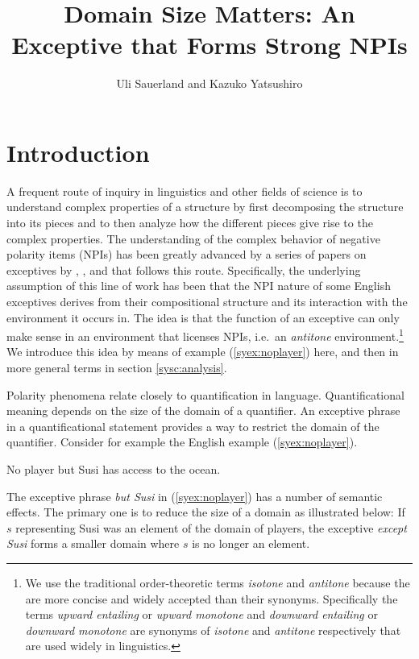 \documentclass[output=paper,colorlinks,citecolor=brown,
]{langscibook}
\author{
    Uli Sauerland%
        \affiliation{Osaka University; Leibniz-Centre General Linguistics}
    and 
    Kazuko Yatsushiro%
        \affiliation{Leibniz-Centre General Linguistics}
}
\title{Domain Size Matters: An Exceptive that Forms Strong NPIs}
\begin{document}

\maketitle


\section{Introduction}

A frequent route of inquiry in linguistics and other fields of science is to understand complex properties of a structure by first decomposing the structure into its pieces and to then analyze how the different pieces give rise to the complex properties.
The understanding of the complex behavior of negative polarity items (NPIs) has been greatly advanced by a series of papers on exceptives by \cite{fintel93}, \cite{gajewski08b}, and \cite{hirsch16b} that follows this  route.
Specifically, the underlying assumption of this line of work has been that the NPI nature of some English exceptives derives from their compositional structure and its interaction with the environment it occurs in.%
%
The idea is that the function of an exceptive can only make sense in an environment that licenses NPIs, i.e.\ an \emph{antitone} environment.\footnote{We use the traditional order-theoretic terms \emph{isotone} and \emph{antitone} \citep{birkhoff40a} because the are more concise and widely accepted than their synonyms.
Specifically the terms \emph{upward entailing} or \emph{upward monotone} and \emph{downward entailing} or \emph{downward monotone}  are synonyms of \emph{isotone} and \emph{antitone} respectively that are used widely in linguistics.}
We introduce this idea by means of example (\ref{syex:noplayer}) here, and then in more general terms in section \ref{sysc:analysis}.

Polarity phenomena relate closely to quantification in language.
Quantificational meaning depends on the size of the domain of a quantifier.
An exceptive phrase in a quantificational statement provides a way to restrict the domain of the quantifier.  Consider for example the English example (\ref{syex:noplayer}).

\ea \label{syex:noplayer} 
   No player but Susi has access to the ocean.\z

The exceptive phrase \emph{but Susi} in (\ref{syex:noplayer}) has a number of semantic effects. The primary one is to reduce the size of a domain as illustrated below:
If $s$ representing Susi was an element of the domain of players, the exceptive \emph{except Susi} forms a smaller domain where $s$ is no longer an element.
\end{document}
